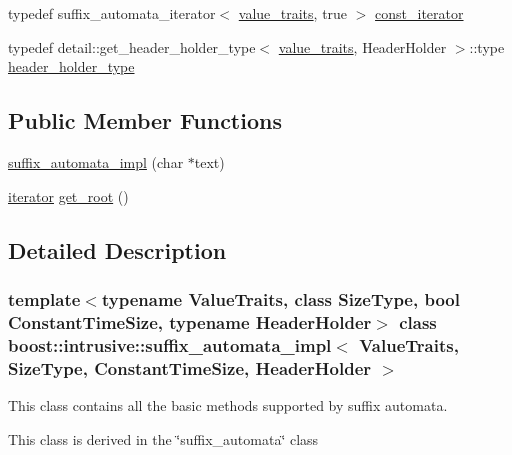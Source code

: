 \begin{DoxyCompactItemize}
\item 
typedef suffix\+\_\+automata\+\_\+iterator$<$ \hyperlink{classboost_1_1intrusive_1_1suffix__automata__impl_abbf3dee8caf18613db903931801c6076}{value\+\_\+traits}, true $>$ \hyperlink{classboost_1_1intrusive_1_1suffix__automata__impl_a370d76fc868eac7454dc2554a8fc9494}{const\+\_\+iterator}
\item 
typedef detail\+::get\+\_\+header\+\_\+holder\+\_\+type$<$ \hyperlink{classboost_1_1intrusive_1_1suffix__automata__impl_abbf3dee8caf18613db903931801c6076}{value\+\_\+traits}, Header\+Holder $>$\+::type \hyperlink{classboost_1_1intrusive_1_1suffix__automata__impl_a0b9a7a78415c25b6b3f377e1269f539a}{header\+\_\+holder\+\_\+type}
\end{DoxyCompactItemize}
\subsection*{Public Member Functions}
\begin{DoxyCompactItemize}
\item 
\hyperlink{classboost_1_1intrusive_1_1suffix__automata__impl_af726049e346e9b927b3ef5b4b4cf1ca4}{suffix\+\_\+automata\+\_\+impl} (char $\ast$text)
\item 
\hyperlink{classboost_1_1intrusive_1_1suffix__automata__impl_af7c03e2d35758eb2040a589cc35cc36c}{iterator} \hyperlink{classboost_1_1intrusive_1_1suffix__automata__impl_a3f7f64f0d173d4cba2766f3833b8adc1}{get\+\_\+root} ()
\end{DoxyCompactItemize}


\subsection{Detailed Description}
\subsubsection*{template$<$typename Value\+Traits, class Size\+Type, bool Constant\+Time\+Size, typename Header\+Holder$>$\newline
class boost\+::intrusive\+::suffix\+\_\+automata\+\_\+impl$<$ Value\+Traits, Size\+Type, Constant\+Time\+Size, Header\+Holder $>$}


\begin{DoxyItemize}
\item This class contains all the basic methods supported by suffix automata.  
\item This class is derived in the \char`\"{}suffix\+\_\+automata\char`\"{} class  
\end{DoxyItemize}

